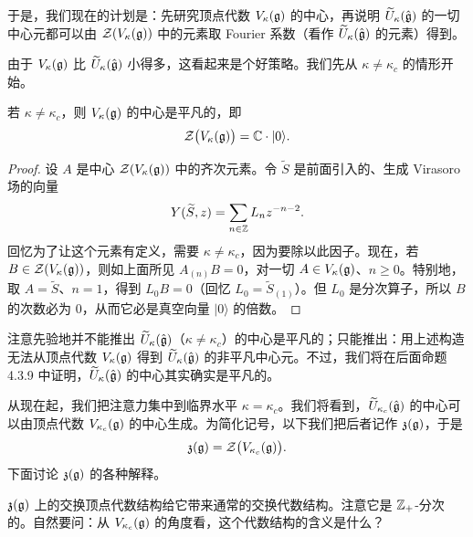于是，我们现在的计划是：先研究顶点代数 $V_\kappa(\mathfrak{g})$ 的中心，再说明 $\widetilde U_\kappa(\hat{\mathfrak{g}})$ 的一切中心元都可以由 $\mathcal{Z}(V_\kappa(\mathfrak{g}))$ 中的元素取 Fourier 系数（看作 $\widetilde U_\kappa(\hat{\mathfrak{g}})$ 的元素）得到。

由于 $V_\kappa(\mathfrak{g})$ 比 $\widetilde U_\kappa(\hat{\mathfrak{g}})$ 小得多，这看起来是个好策略。我们先从 $\kappa\neq\kappa_c$ 的情形开始。

\begin{proposition}
    若 $\kappa\neq\kappa_c$，则 $V_\kappa(\mathfrak{g})$ 的中心是平凡的，即
    \[
        \mathcal{Z}\bigl(V_\kappa(\mathfrak{g})\bigr) = \mathbb{C}\cdot|0\rangle .
    \]
\end{proposition}

\begin{proof}
    设 $A$ 是中心 $\mathcal{Z}(V_\kappa(\mathfrak{g}))$ 中的齐次元素。令 $\widetilde S$ 是前面引入的、生成 Virasoro 场的向量
    \[
        Y(\widetilde S, z) = \sum_{n\in\mathbb{Z}} L_n z^{-n-2}.
    \]
    回忆为了让这个元素有定义，需要 $\kappa\neq\kappa_c$，因为要除以此因子。现在，若 $B\in\mathcal{Z}(V_\kappa(\mathfrak{g}))$，则如上面所见 $A_{(n)}B=0$，对一切 $A\in V_\kappa(\mathfrak{g})$、$n\ge 0$。特别地，取 $A=\widetilde S$、$n=1$，得到 $L_0B=0$（回忆 $L_0=\widetilde S_{(1)}$）。但 $L_0$ 是分次算子，所以 $B$ 的次数必为 $0$，从而它必是真空向量 $|0\rangle$ 的倍数。
\end{proof}


注意先验地并不能推出 $\widetilde U_\kappa(\hat{\mathfrak{g}})$（$\kappa\neq\kappa_c$）的中心是平凡的；只能推出：用上述构造无法从顶点代数 $V_\kappa(\mathfrak{g})$ 得到 $\widetilde U_\kappa(\hat{\mathfrak{g}})$ 的非平凡中心元。不过，我们将在后面命题 4.3.9 中证明，$\widetilde U_\kappa(\hat{\mathfrak{g}})$ 的中心其实确实是平凡的。

从现在起，我们把注意力集中到临界水平 $\kappa=\kappa_c$。我们将看到，$\widetilde U_{\kappa_c}(\hat{\mathfrak{g}})$ 的中心可以由顶点代数 $V_{\kappa_c}(\mathfrak{g})$ 的中心生成。为简化记号，以下我们把后者记作 $\mathfrak z(\mathfrak{g})$，于是
\[
    \mathfrak z(\mathfrak{g}) = \mathcal{Z}\bigl(V_{\kappa_c}(\mathfrak{g})\bigr).
\]
下面讨论 $\mathfrak z(\mathfrak{g})$ 的各种解释。

$\mathfrak z(\mathfrak{g})$ 上的交换顶点代数结构给它带来通常的交换代数结构。注意它是 $\mathbb{Z}_+$-分次的。自然要问：从 $V_{\kappa_c}(\mathfrak{g})$ 的角度看，这个代数结构的含义是什么？

